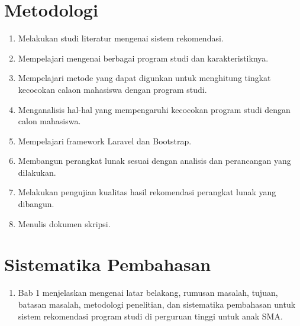 \section{Metodologi}
\label{sec:metlit}
\begin{enumerate}
	\item Melakukan studi literatur mengenai sistem rekomendasi.
	\item Mempelajari mengenai berbagai program studi dan karakteristiknya.
	\item Mempelajari metode yang dapat digunkan untuk menghitung tingkat kecocokan calaon mahasiswa dengan program studi.
	\item Menganalisis hal-hal yang mempengaruhi kecocokan program studi dengan calon mahasiswa.
	\item Mempelajari framework Laravel dan Bootstrap.
	\item Membangun perangkat lunak sesuai dengan analisis dan perancangan yang dilakukan.
	\item Melakukan pengujian kualitas hasil rekomendasi perangkat lunak yang dibangun.
	\item Menulis dokumen skripsi.
\end{enumerate}


\section{Sistematika Pembahasan}
\label{sec:sispem}
\begin{enumerate}
	\item Bab 1 menjelaskan mengenai latar belakang, rumusan masalah, tujuan, batasan masalah, metodologi penelitian, dan sistematika pembahasan untuk sistem rekomendasi program studi di perguruan tinggi untuk anak SMA.
\end{enumerate}
